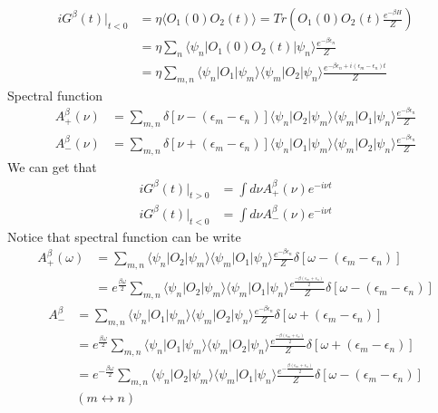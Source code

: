 \documentclass[a4paper,11pt]{article}
\begin{document}
\begin{equation*}
  \begin{split}
     iG^\beta(t)|_{t<0}&=\eta\langle O_1(0)O_2(t)\rangle=Tr\left(O_1(0)O_2(t)\frac{e^{-\beta H}}{Z}\right)\\
       &=\eta\sum_{n}\langle\psi_n|O_1(0)O_2(t)|\psi_n\rangle\frac{e^{-\beta\epsilon_n}}{Z}\\
       &=\eta\sum_{m,n}\langle\psi_n|O_1|\psi_m\rangle\langle\psi_m|O_2|\psi_n\rangle\frac{e^{-\beta\epsilon_n+i(\epsilon_m-\epsilon_n)t}}{Z}
  \end{split}
\end{equation*}
Spectral function
\begin{equation*}
  \begin{split}
     A_+^\beta(\nu) & =\sum_{m,n}\delta[\nu-(\epsilon_m-\epsilon_n)]\langle\psi_n|O_2|\psi_m\rangle\langle\psi_m|O_1|\psi_n\rangle\frac{e^{-\beta\epsilon_n}}{Z} \\
     A_-^\beta(\nu) & =\sum_{m,n}\delta[\nu+(\epsilon_m-\epsilon_n)]\langle\psi_n|O_1|\psi_m\rangle\langle\psi_m|O_2|\psi_n\rangle\frac{e^{-\beta\epsilon_n}}{Z}
  \end{split}
\end{equation*}
We can get that
\begin{equation*}
  \begin{split}
     iG^\beta(t)|_{t>0} & =\int d\nu A_+^\beta(\nu)e^{-i\nu t} \\
     iG^\beta(t)|_{t<0} & =\int d\nu A_-^\beta(\nu)e^{-i\nu t}
  \end{split}
\end{equation*}
Notice that spectral function can be write
\begin{equation*}
  \begin{split}
     A_+^\beta(\omega) & =\sum_{m,n}\langle\psi_n|O_2|\psi_m\rangle\langle\psi_m|O_1|\psi_n\rangle\frac{e^{-\beta\epsilon_n}}{Z}\delta[\omega-(\epsilon_m-\epsilon_n)] \\
       &=e^{\frac{\beta\omega}{2}}\sum_{m,n}\langle\psi_n|O_2|\psi_m\rangle\langle\psi_m|O_1|\psi_n\rangle\frac{e^{\frac{-\beta(\epsilon_m+\epsilon_n)}{2}}}{Z}\delta[\omega-(\epsilon_m-\epsilon_n)]
  \end{split}
\end{equation*}
\begin{equation*}
  \begin{split}
     A_-^\beta&=\sum_{m,n}\langle\psi_n|O_1|\psi_m\rangle\langle\psi_m|O_2|\psi_n\rangle\frac{e^{-\beta\epsilon_n}}{Z}\delta[\omega+(\epsilon_m-\epsilon_n)]\\
       &=e^{\frac{\beta\omega}{2}}\sum_{m,n}\langle\psi_n|O_1|\psi_m\rangle\langle\psi_m|O_2|\psi_n\rangle\frac{e^{\frac{-\beta(\epsilon_m+\epsilon_n)}{2}}}{Z}\delta[\omega+(\epsilon_m-\epsilon_n)]\\
       &=e^{-\frac{\beta\omega}{2}}\sum_{m,n}\langle\psi_n|O_2|\psi_m\rangle\langle\psi_m|O_1|\psi_n\rangle\frac{e^{-\frac{\beta(\epsilon_m+\epsilon_n)}{2}}}{Z}\delta[\omega-(\epsilon_m-\epsilon_n)]\\
       &(m\leftrightarrow n)
  \end{split}
\end{equation*}
\end{document}
